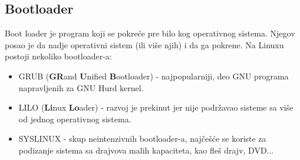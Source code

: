 \subsection{Bootloader}
Boot loader je program koji se pokreće pre bilo kog operativnog sistema. Njegov posao je da nadje operativni sistem (ili više njih) i da ga pokrene. Na Linuxu postoji nekoliko bootloader-a:\begin{itemize}
\item GRUB (\textbf{GR}and \textbf{U}nified \textbf{B}ootloader) - najpopularniji, deo GNU programa napravljenih za GNU Hurd kernel.
\item LILO (\textbf{Li}nux \textbf{Lo}ader) - razvoj je prekinut jer nije podržavao sisteme sa više od jednog operativnog sistema.
\item SYSLINUX - skup neintenzivnih bootloader-a, najčešće se koriste za podizanje sistema sa drajvova malih kapaciteta, kao fleš drajv, DVD...
\end{itemize}



